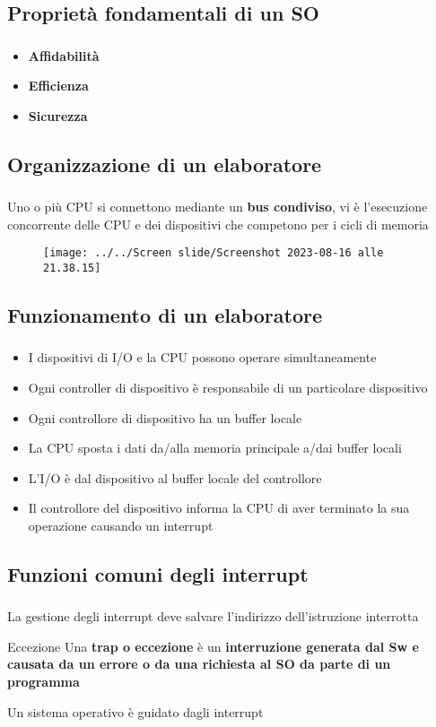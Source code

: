 \documentclass{beamer}
\newenvironment{mainframe}{
	\begin{frame}
		\frametitle{\insertsubsection}
		\framesubtitle{\insertsection}
	}{
	\end{frame}
}
\begin{document}
\subsection{Proprietà fondamentali di un SO}
\begin{mainframe}
	\begin{itemize}
		\item \textbf{Affidabilità}
		\item \textbf{Efficienza}
		\item \textbf{Sicurezza}
	\end{itemize}
\end{mainframe}
\subsection{Organizzazione di un elaboratore}
\begin{mainframe}
		Uno o più CPU si connettono mediante un \textbf{bus condiviso}, vi è l'esecuzione concorrente delle CPU e dei dispositivi che competono per i cicli di memoria
		\begin{figure}[h!]
			\centering
			\texttt{[image: ../../Screen slide/Screenshot 2023-08-16 alle 21.38.15]}
		\end{figure}
\end{mainframe}
\subsection{Funzionamento di un elaboratore}
\begin{mainframe}
	\begin{itemize}
		\item I dispositivi di I/O e la CPU possono operare simultaneamente
		\item Ogni controller di dispositivo è responsabile di un particolare dispositivo
		\item Ogni controllore di dispositivo ha un buffer locale
		\item La CPU sposta i dati da/alla memoria principale a/dai buffer locali
		\item L'I/O è dal dispositivo al buffer locale del controllore
		\item Il controllore del dispositivo informa la CPU di aver terminato la sua operazione causando un interrupt
	\end{itemize}
\end{mainframe}
\subsection{Funzioni comuni degli interrupt}
\begin{mainframe}
	La gestione degli interrupt deve salvare l'indirizzo dell'istruzione interrotta
	\begin{block}{Eccezione}
		Una \textbf{trap o eccezione} è un \textbf{interruzione generata dal Sw e causata da un errore o da una richiesta al SO da parte di un programma}
	\end{block}
	Un sistema operativo è guidato dagli interrupt
\end{mainframe}
\end{document}
